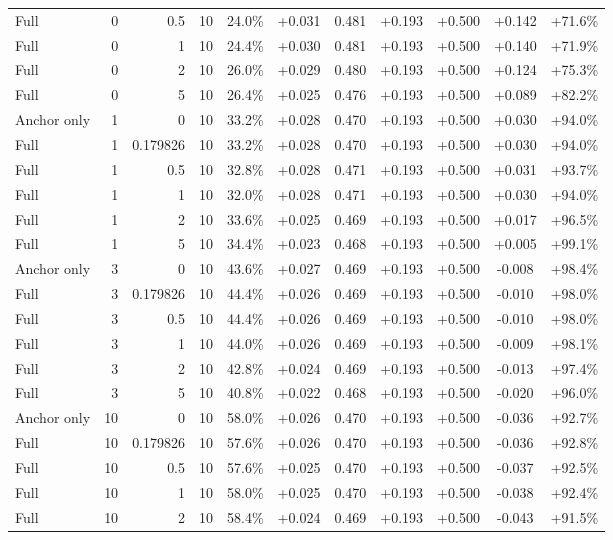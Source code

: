 \begin{table}[htbp]
\begin{tabular}{lrrrccccccc}
Full & 0 & 0.5 & 10 & 24.0\% & +0.031 & 0.481 & +0.193 & +0.500 & +0.142 & +71.6\% \\
Full & 0 & 1 & 10 & 24.4\% & +0.030 & 0.481 & +0.193 & +0.500 & +0.140 & +71.9\% \\
Full & 0 & 2 & 10 & 26.0\% & +0.029 & 0.480 & +0.193 & +0.500 & +0.124 & +75.3\% \\
Full & 0 & 5 & 10 & 26.4\% & +0.025 & 0.476 & +0.193 & +0.500 & +0.089 & +82.2\% \\
Anchor only & 1 & 0 & 10 & 33.2\% & +0.028 & 0.470 & +0.193 & +0.500 & +0.030 & +94.0\% \\
Full & 1 & 0.179826 & 10 & 33.2\% & +0.028 & 0.470 & +0.193 & +0.500 & +0.030 & +94.0\% \\
Full & 1 & 0.5 & 10 & 32.8\% & +0.028 & 0.471 & +0.193 & +0.500 & +0.031 & +93.7\% \\
Full & 1 & 1 & 10 & 32.0\% & +0.028 & 0.471 & +0.193 & +0.500 & +0.030 & +94.0\% \\
Full & 1 & 2 & 10 & 33.6\% & +0.025 & 0.469 & +0.193 & +0.500 & +0.017 & +96.5\% \\
Full & 1 & 5 & 10 & 34.4\% & +0.023 & 0.468 & +0.193 & +0.500 & +0.005 & +99.1\% \\
Anchor only & 3 & 0 & 10 & 43.6\% & +0.027 & 0.469 & +0.193 & +0.500 & -0.008 & +98.4\% \\
Full & 3 & 0.179826 & 10 & 44.4\% & +0.026 & 0.469 & +0.193 & +0.500 & -0.010 & +98.0\% \\
Full & 3 & 0.5 & 10 & 44.4\% & +0.026 & 0.469 & +0.193 & +0.500 & -0.010 & +98.0\% \\
Full & 3 & 1 & 10 & 44.0\% & +0.026 & 0.469 & +0.193 & +0.500 & -0.009 & +98.1\% \\
Full & 3 & 2 & 10 & 42.8\% & +0.024 & 0.469 & +0.193 & +0.500 & -0.013 & +97.4\% \\
Full & 3 & 5 & 10 & 40.8\% & +0.022 & 0.468 & +0.193 & +0.500 & -0.020 & +96.0\% \\
Anchor only & 10 & 0 & 10 & 58.0\% & +0.026 & 0.470 & +0.193 & +0.500 & -0.036 & +92.7\% \\
Full & 10 & 0.179826 & 10 & 57.6\% & +0.026 & 0.470 & +0.193 & +0.500 & -0.036 & +92.8\% \\
Full & 10 & 0.5 & 10 & 57.6\% & +0.025 & 0.470 & +0.193 & +0.500 & -0.037 & +92.5\% \\
Full & 10 & 1 & 10 & 58.0\% & +0.025 & 0.470 & +0.193 & +0.500 & -0.038 & +92.4\% \\
Full & 10 & 2 & 10 & 58.4\% & +0.024 & 0.469 & +0.193 & +0.500 & -0.043 & +91.5\% \\

\end{tabular}
\end{table}
